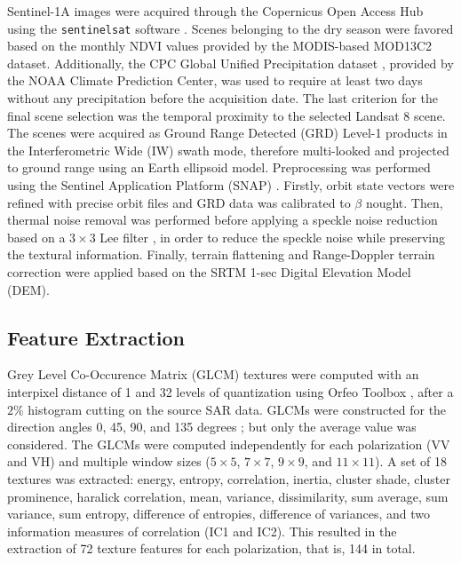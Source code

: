 \documentclass[remotesensing,article,submit,moreauthors,pdftex,10pt,a4paper]{Definitions/mdpi}
\begin{document}
Sentinel-1A images were acquired through the Copernicus Open Access
Hub using the \texttt{sentinelsat} software \cite{Clauss2018}. Scenes belonging
to the dry season were favored based on the monthly NDVI values provided by the
MODIS-based MOD13C2 dataset. Additionally, the CPC Global Unified Precipitation
dataset \cite{Chen2008}, provided by the NOAA Climate Prediction Center, was
used to require at least two days without any precipitation before the
acquisition date. The last criterion for the final scene selection was the
temporal proximity to the selected Landsat 8 scene. The scenes were acquired as
Ground Range Detected (GRD) Level-1 products in the Interferometric Wide (IW)
swath mode, therefore multi-looked and projected to ground range using an Earth
ellipsoid model. Preprocessing was performed using the Sentinel Application
Platform (SNAP) \cite{ESA2018}. Firstly, orbit state vectors were refined with
precise orbit files and GRD data was calibrated to \(\beta\) nought. Then,
thermal noise removal was performed before applying a speckle noise reduction
based on a \(3 \times 3\) Lee filter \cite{Lee1981}, in order to reduce the
speckle noise while preserving the textural information. Finally, terrain
flattening \cite{Small2011} and Range-Doppler terrain correction
\cite{Small2008} were applied based on the SRTM 1-sec Digital Elevation Model
(DEM).

\subsection{Feature Extraction}

Grey Level Co-Occurence Matrix (GLCM) textures were computed with an interpixel
distance of 1 and 32 levels of quantization using Orfeo Toolbox
\cite{Grizonnet2017}, after a \(2\%\) histogram cutting on the source SAR data.
GLCMs were constructed for the direction angles 0, 45, 90, and 135 degrees ; but
only the average value was considered. The GLCMs were computed independently for
each polarization (VV and VH) and multiple window sizes (\(5 \times 5\), \(7
\times 7\), \(9 \times 9\), and \(11 \times 11\)). A set of 18 textures was
extracted: energy, entropy, correlation, inertia, cluster shade, cluster
prominence, haralick correlation, mean, variance, dissimilarity, sum average,
sum variance, sum entropy, difference of entropies, difference of variances, and
two information measures of correlation (IC1 and IC2). This resulted in the
extraction of 72 texture features for each polarization, that is, 144 in total.
\end{document}
